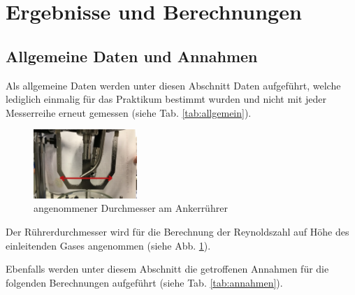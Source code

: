 \section{Ergebnisse und Berechnungen}
\label{sec:ergebnisse}

\subsection{Allgemeine Daten und Annahmen}
Als allgemeine Daten werden unter diesen Abschnitt Daten aufgeführt, welche lediglich einmalig für das Praktikum bestimmt wurden und nicht mit jeder Messerreihe erneut gemessen (siehe Tab. \ref{tab:allgemein}).

\begin{table}[h!]
	\renewcommand*{\arraystretch}{1.2}
	\centering
	\caption{Allgemeine Daten}
	\label{tab:allgemein}
\end{table}%
\FloatBarrier

\begin{figure}[h!]
	\centering
	\includegraphics[width=0.35\textwidth]{img/anker}
	\caption{angenommener Durchmesser am Ankerrührer}
	\label{fig:anker}
\end{figure}
\FloatBarrier
Der Rührerdurchmesser wird für die Berechnung der Reynoldszahl auf Höhe des einleitenden Gases angenommen (siehe Abb. \ref{fig:anker}).

Ebenfalls werden unter diesem Abschnitt die getroffenen Annahmen für die folgenden Berechnungen aufgeführt (siehe Tab. \ref{tab:annahmen}).

